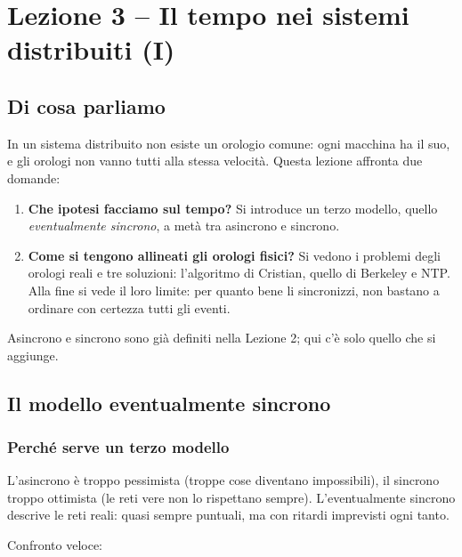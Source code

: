 \chapter{Lezione 3 -- Il tempo nei sistemi distribuiti (I)}

\section{Di cosa parliamo}

In un sistema distribuito non esiste un orologio comune: ogni macchina ha il suo, e gli orologi non vanno tutti alla stessa velocità. Questa lezione affronta due domande:

\begin{enumerate}
\def\labelenumi{\arabic{enumi}.}
\tightlist
\item
  \textbf{Che ipotesi facciamo sul tempo?} Si introduce un terzo modello, quello \emph{eventualmente sincrono}, a metà tra asincrono e sincrono.
\item
  \textbf{Come si tengono allineati gli orologi fisici?} Si vedono i problemi degli orologi reali e tre soluzioni: l'algoritmo di Cristian, quello di Berkeley e NTP. Alla fine si vede il loro limite: per quanto bene li sincronizzi, non bastano a ordinare con certezza tutti gli eventi.
\end{enumerate}

Asincrono e sincrono sono già definiti nella Lezione 2; qui c'è solo quello che si aggiunge.

\section{Il modello eventualmente sincrono}

\subsection{Perché serve un terzo modello}

\begin{inbreve}

L'asincrono è troppo pessimista (troppe cose diventano impossibili), il sincrono troppo ottimista (le reti vere non lo rispettano sempre). L'eventualmente sincrono descrive le reti reali: quasi sempre puntuali, ma con ritardi imprevisti ogni tanto.

\end{inbreve}

Confronto veloce:

